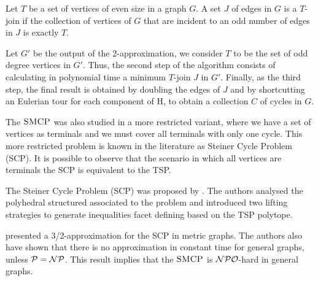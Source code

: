 Let \(T\) be a set of vertices of even size in a graph \(G\). A set \(J\) of edges in \(G\) is a \(T\)-join if the collection of vertices of \(G\) that are incident to an odd number of edges in \(J\) is exactly \(T\).

Let \(G'\) be the output of the 2-approximation, we consider \(T\) to be the set of odd degree vertices in \(G'\). Thus, the second step of the algorithm consists of calculating in polynomial time a minimum \(T\)-join \(J\) in \(G'\). Finally, as the third step, the final result is obtained by doubling the edges of \(J\) and by shortcutting an Eulerian tour for each component of H, to obtain a collection \(C\) of cycles in \(G\).

The \(\textsc{SMCP}\) was also studied in a more restricted variant, where we have a set of vertices as terminals and we must cover all terminals with only one cycle. This more restricted problem is known in the literature as Steiner Cycle Problem (SCP). It is possible to observe that the scenario in which all vertices are terminals the SCP is equivalent to the TSP.


The Steiner Cycle Problem (SCP) was proposed by \cite{SalazarSteinerCycle}. The authors analysed the polyhedral structured associated to the problem and introduced two lifting strategies to generate inequalities facet defining based on the TSP polytope.


\cite{SteinovaSteinerCycle} presented a 3/2-approximation for the SCP in metric graphs. The authors also have shown that there is no approximation in constant time for general graphs, unless \(\mathcal{P} = \mathcal{NP}\). This result implies that the \(\textsc{SMCP}\) is \(\mathcal{NPO}\)-hard in general graphs.



